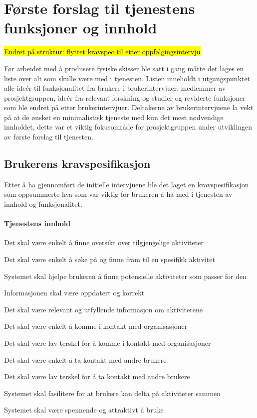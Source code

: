 \section{Første forslag til tjenestens funksjoner og innhold}
\hl{Endret på struktur: flyttet kravspec til etter oppfølgingsintervju}

Før arbeidet med å produsere fysiske skisser ble satt i gang måtte det lages en liste over alt som skulle være med i tjenesten. Listen inneholdt i utgangspunktet alle ideér til funksjonalitet fra brukere i brukerintervjuer, medlemmer av prosjektgruppen, ideér fra relevant forskning og studier og reviderte funksjoner som ble endret på etter brukerintervjuer. Deltakerne av brukerintervjuene la vekt på at de ønsket en minimalistisk tjeneste med kun det mest nødvendige innholdet, dette var et viktig fokusområde for prosjektgruppen under utviklingen av første forslag til tjenesten.

\subsection{Brukerens kravspesifikasjon}
\label{section:kravspec}
Etter å ha gjennomført de initielle intervjuene ble det laget en kravspesifikasjon som oppsummerte hva som var viktig for brukeren å ha med i tjenesten av innhold og funksjonalitet.

\paragraph{Tjenestens innhold}
\begin{compactitem}
\item Det skal være enkelt å finne oversikt over tilgjengelige aktiviteter
\item Det skal være enkelt å søke på og finne fram til en spesifikk aktivitet
\item Systemet skal hjelpe brukeren å finne potensielle aktiviteter som passer for den
\item Informasjonen skal være oppdatert og korrekt
\item Det skal være relevant og utfyllende informasjon om aktivitetene
\item Det skal være enkelt å komme i kontakt med organisasjoner
\item Det skal være lav terskel for å komme i kontakt med organisasjoner
\item Det skal være enkelt å ta kontakt med andre brukere
\item Det skal være lav terskel for å ta kontakt med andre brukere
\item Systemet skal fasilitere for at brukere kan delta på aktiviteter sammen
\item Systemet skal være spennende og attraktivt å bruke
\end{compactitem}

